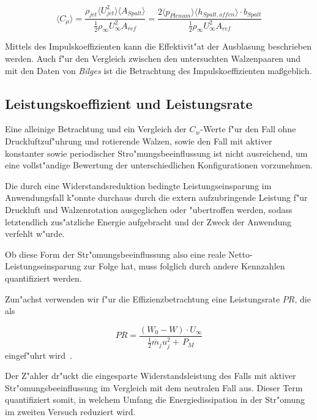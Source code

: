 	\begin{equation}
	\label{eq:momentum-coeff-oscill-final}
		\langle{C_{\mu}}\rangle = \frac{\rho_{jet}\langle{U^2_{jet}}\rangle \langle{A_{Spalt}}\rangle} {\frac{1}{2}\rho_{\infty}U^2_{\infty}A_{ref}} = \frac{2\langle{p_{Plenum}}\rangle \langle{h_{Spalt,offen}}\rangle \cdot b_{Spalt}} {\frac{1}{2}\rho_{\infty}U^2_{\infty}A_{ref}}
	\end{equation}

Mittels des Impulskoeffizienten kann die Effektivit"at der Ausblasung beschrieben werden.
Auch f"ur den Vergleich zwischen den untersuchten Walzenpaaren und mit den Daten von \textit{Bilges}\cite{Bilges.2018} ist die Betrachtung des Impulskoeffizienten ma\ss{}geblich.

\subsection{Leistungskoeffizient und Leistungsrate}
Eine alleinige Betrachtung und ein Vergleich der $C_w$-Werte f"ur den Fall ohne Druckluftzuf"uhrung und rotierende Walzen, sowie den Fall mit aktiver konstanter sowie periodischer Stro"mungsbeeinflussung ist nicht ausreichend, um eine vollst"andige Bewertung der unterschiedlichen Konfigurationen vorzunehmen.

Die durch eine Widerstandsreduktion bedingte Leistungseinsparung im Anwendungsfall k"onnte durchaus durch die extern aufzubringende Leistung f"ur Druckluft und Walzenrotation ausgeglichen oder "ubertroffen werden, sodass letztendlich zus"atzliche Energie aufgebracht und der Zweck der Anwendung verfehlt w"urde.

Ob diese Form der Str"omungsbeeinflussung also eine reale Netto-Leistungseinsparung zur Folge hat, muss folglich durch andere Kennzahlen quantifiziert werden.

Zun"achst verwenden wir f"ur die Effizienzbetrachtung eine Leistungsrate $PR$, die als 

\begin{equation}
	\label{eq:leistungsrate}
	PR = \frac{(W_0 - W)\cdot U_{\infty}}{\frac{1}{2} \dot{m_j} u_j^2 + \, P_M}
\end{equation}
eingef"uhrt wird~\cite{Freund.1994}.

Der Z"ahler dr"uckt die eingesparte Widerstandsleistung des Falls mit aktiver Str"omungsbeeinflussung im Vergleich mit dem neutralen Fall aus.
Dieser Term quantifiziert somit, in welchem Umfang die Energiedissipation in der Str"omung im zweiten Versuch reduziert wird.

